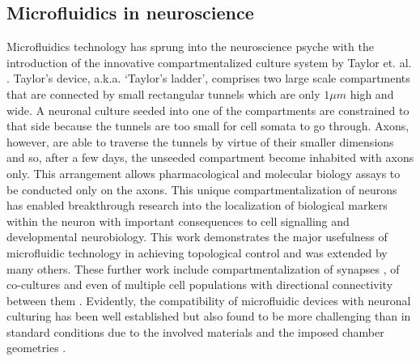     \subsection{Microfluidics in neuroscience}
    Microfluidics technology has sprung into the neuroscience psyche with the introduction of the innovative compartmentalized culture system by Taylor et. al. \cite{taylor2005microfluidic}. Taylor's device, a.k.a. `Taylor's ladder', comprises two large scale compartments that are connected by small rectangular tunnels which are only \(1 \mu m\) high and wide. A neuronal culture seeded into one of the compartments are constrained to that side because the tunnels are too small for cell somata to go through. Axons, however, are able to traverse the tunnels by virtue of their smaller dimensions and so, after a few days, the unseeded compartment become inhabited with axons only. This arrangement allows pharmacological and molecular biology assays to be conducted only on the axons. This unique compartmentalization of neurons has enabled breakthrough research into the localization of biological markers within the neuron with important consequences to cell signalling and developmental neurobiology. This work demonstrates the major usefulness of microfluidic technology in achieving topological control and was extended by many others. These further work include compartmentalization of synapses \cite{taylor2010microfluidic}, of co-cultures \cite{robertson2014chemically,renault2015combining} and even of multiple cell populations with directional connectivity between them \cite{peyrin2011axon,honegger2016microfluidic,dauth2016neurons}. Evidently, the compatibility of microfluidic devices with neuronal culturing has been well established but also found to be more challenging than in standard conditions due to the involved materials and the imposed chamber geometries \cite{millet2007microfluidic}.


    \label{sec:introduction:mufdNeuroscience}
